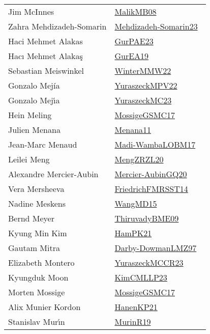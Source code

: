 {\begin{longtable}{p{4cm}p{20cm}}
Jim McInnes & \href{}{MalikMB08}~\cite{MalikMB08}\\
Zahra Mehdizadeh{-}Somarin & \href{works/Mehdizadeh-Somarin23.pdf}{Mehdizadeh-Somarin23}~\cite{Mehdizadeh-Somarin23}\\
Haci Mehmet Alakas & \href{works/GurPAE23.pdf}{GurPAE23}~\cite{GurPAE23}\\
Hacı Mehmet Alakaş & \href{works/GurEA19.pdf}{GurEA19}~\cite{GurEA19}\\
Sebastian Meiswinkel & \href{works/WinterMMW22.pdf}{WinterMMW22}~\cite{WinterMMW22}\\
Gonzalo Mej{\'i}a & \href{works/YuraszeckMPV22.pdf}{YuraszeckMPV22}~\cite{YuraszeckMPV22}\\
Gonzalo Mej{\'{\i}}a & \href{works/YuraszeckMC23.pdf}{YuraszeckMC23}~\cite{YuraszeckMC23}\\
Hein Meling & \href{works/MossigeGSMC17.pdf}{MossigeGSMC17}~\cite{MossigeGSMC17}\\
Julien Menana & \href{}{Menana11}~\cite{Menana11}\\
Jean{-}Marc Menaud & \href{works/Madi-WambaLOBM17.pdf}{Madi-WambaLOBM17}~\cite{Madi-WambaLOBM17}\\
Leilei Meng & \href{works/MengZRZL20.pdf}{MengZRZL20}~\cite{MengZRZL20}\\
Alexandre Mercier{-}Aubin & \href{works/Mercier-AubinGQ20.pdf}{Mercier-AubinGQ20}~\cite{Mercier-AubinGQ20}\\
Vera Mersheeva & \href{}{FriedrichFMRSST14}~\cite{FriedrichFMRSST14}\\
Nadine Meskens & \href{works/WangMD15.pdf}{WangMD15}~\cite{WangMD15}\\
Bernd Meyer & \href{works/ThiruvadyBME09.pdf}{ThiruvadyBME09}~\cite{ThiruvadyBME09}\\
Kyung Min Kim & \href{works/HamPK21.pdf}{HamPK21}~\cite{HamPK21}\\
Gautam Mitra & \href{works/Darby-DowmanLMZ97.pdf}{Darby-DowmanLMZ97}~\cite{Darby-DowmanLMZ97}\\
Elizabeth Montero & \href{works/YuraszeckMCCR23.pdf}{YuraszeckMCCR23}~\cite{YuraszeckMCCR23}\\
Kyungduk Moon & \href{works/KimCMLLP23.pdf}{KimCMLLP23}~\cite{KimCMLLP23}\\
Morten Mossige & \href{works/MossigeGSMC17.pdf}{MossigeGSMC17}~\cite{MossigeGSMC17}\\
Alix Munier Kordon & \href{works/HanenKP21.pdf}{HanenKP21}~\cite{HanenKP21}\\
Stanislav Mur{\'{\i}}n & \href{works/MurinR19.pdf}{MurinR19}~\cite{MurinR19}\\

\end{longtable}}
